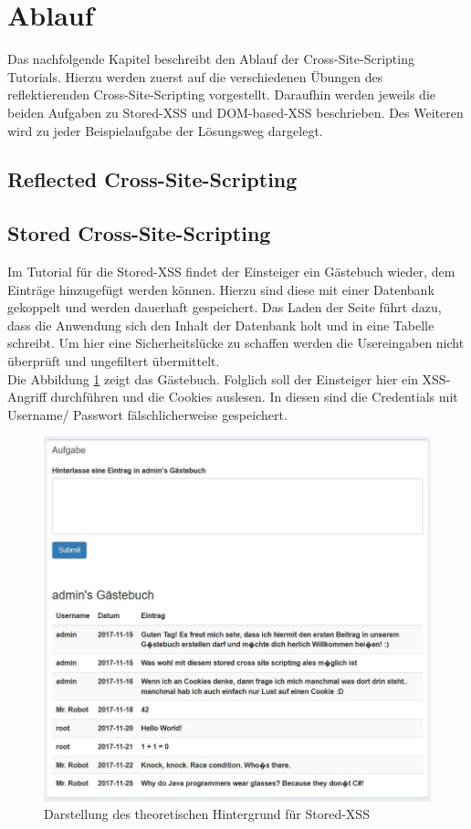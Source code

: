 \section{Ablauf}
Das nachfolgende Kapitel beschreibt den Ablauf der Cross-Site-Scripting Tutorials. Hierzu werden zuerst auf die verschiedenen Übungen des reflektierenden Cross-Site-Scripting vorgestellt. Daraufhin werden jeweils die beiden Aufgaben zu Stored-XSS und DOM-based-XSS beschrieben. Des Weiteren wird zu jeder Beispielaufgabe der Lösungsweg dargelegt. 

\subsection{Reflected Cross-Site-Scripting}

\subsection{Stored Cross-Site-Scripting}
Im Tutorial für die Stored-XSS findet der Einsteiger ein Gästebuch wieder, dem Einträge hinzugefügt werden können. Hierzu sind diese mit einer Datenbank gekoppelt und werden dauerhaft gespeichert. Das Laden der Seite führt dazu, dass die Anwendung sich den Inhalt der Datenbank holt und in eine Tabelle schreibt. Um hier eine Sicherheitslücke zu schaffen werden die Usereingaben nicht überprüft und ungefiltert übermittelt. \\ 
Die Abbildung \ref{fig:stored-xss-aufgabe} zeigt das Gästebuch. Folglich soll der Einsteiger hier ein XSS-Angriff durchführen und die Cookies auslesen. In diesen sind die Credentials mit Username/ Passwort fälschlicherweise gespeichert. \\ 

\begin{figure}[H]
	\centering
	\includegraphics[width=\textwidth]{images/XSS/stored-xss-aufgabe.jpg}
	\caption{Darstellung des theoretischen Hintergrund für Stored-XSS}
	\label{fig:stored-xss-aufgabe}
\end{figure}

